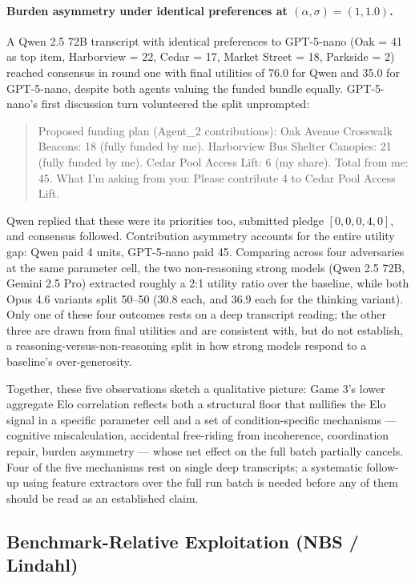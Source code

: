 \paragraph{Burden asymmetry under identical preferences at $(\alpha, \sigma) = (1, 1.0)$.} A Qwen 2.5 72B transcript with identical preferences to GPT-5-nano (Oak = 41 as top item, Harborview = 22, Cedar = 17, Market Street = 18, Parkside = 2) reached consensus in round one with final utilities of 76.0 for Qwen and 35.0 for GPT-5-nano, despite both agents valuing the funded bundle equally. GPT-5-nano's first discussion turn volunteered the split unprompted:
\begin{quote}
Proposed funding plan (Agent\_2 contributions):
Oak Avenue Crosswalk Beacons: 18 (fully funded by me). Harborview Bus Shelter Canopies: 21 (fully funded by me). Cedar Pool Access Lift: 6 (my share). Total from me: 45. What I'm asking from you: Please contribute 4 to Cedar Pool Access Lift.
\end{quote}
Qwen replied that these were its priorities too, submitted pledge $[0,0,0,4,0]$, and consensus followed. Contribution asymmetry accounts for the entire utility gap: Qwen paid 4 units, GPT-5-nano paid 45. Comparing across four adversaries at the same parameter cell, the two non-reasoning strong models (Qwen 2.5 72B, Gemini 2.5 Pro) extracted roughly a 2:1 utility ratio over the baseline, while both Opus 4.6 variants split 50--50 (30.8 each, and 36.9 each for the thinking variant). Only one of these four outcomes rests on a deep transcript reading; the other three are drawn from final utilities and are consistent with, but do not establish, a reasoning-versus-non-reasoning split in how strong models respond to a baseline's over-generosity.

\medskip
Together, these five observations sketch a qualitative picture: Game 3's lower aggregate Elo correlation reflects both a structural floor that nullifies the Elo signal in a specific parameter cell and a set of condition-specific mechanisms --- cognitive miscalculation, accidental free-riding from incoherence, coordination repair, burden asymmetry --- whose net effect on the full batch partially cancels. Four of the five mechanisms rest on single deep transcripts; a systematic follow-up using feature extractors over the full run batch is needed before any of them should be read as an established claim.

\subsection{Benchmark-Relative Exploitation (NBS / Lindahl)}
\label{sec:benchmark_exploitation_results}


